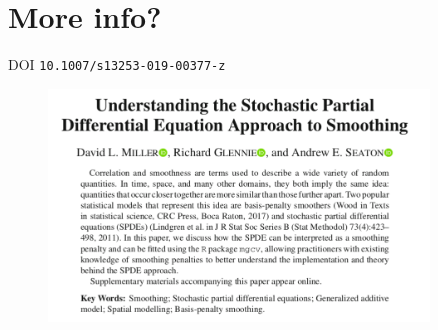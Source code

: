 \documentclass{beamer}
\begin{document}
%
%
%
%
%
%




\section{More info?}

\begin{frame}{DOI \texttt{10.1007/s13253-019-00377-z}}
  \begin{figure}[htbp]
    \begin{center}
      \includegraphics[width=0.9\textwidth]{figures/paper.png}
    \end{center}
  \end{figure}
\end{frame}

%
\end{document}
